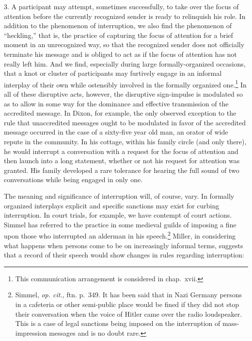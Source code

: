 \documentclass[twoside,symmetric,nobib,justified]{tufte-book}
\begin{document}
3. A participant may attempt, sometimes successfully, to take over the
focus of attention before the currently recognized sender is ready to
relinquish his role. In addition to the phenomenon of interruption, we
also find the phenomenon of ``heckling,'' that is, the practice of
capturing the focus of attention for a brief moment in an unrecognized
way, so that the recognized sender does not officially terminate his
message and is obliged to act as if the focus of attention has not
really left him. And we find, especially during large formally-organized
occasions, that a knot or cluster of participants may furtively engage
in an informal interplay of their own while ostensibly involved in the
formally organized one.\footnote{This communication arrangement is
  considered in chap.~xvii.} In all of these disruptive acts, however,
the disruptive sign-impulse is modulated so as to allow in some way for
the dominance and effective transmission of the accredited message. In
Dixon, for example, the only observed exception to the rule that
unaccredited messages ought to be modulated in favor of the accredited
message occurred in the case of a sixty-five year old man, an orator of
wide repute in the community. In his cottage, within his family circle
(and only there), he would interrupt a conversation with a request for
the focus of attention and then launch into a long statement, whether or
not his request for attention was granted. His family developed a rare
tolerance for hearing the full sound of two conversations while being
engaged in only one.

The meaning and significance of interruption will, of course, vary. In
formally organized interplays explicit and specific sanctions may exist
for curbing interruption. In court trials, for example, we have contempt
of court actions. Simmel has referred to the practice in some medieval
guilds of imposing a fine upon those who interrupted an alderman in his
speech.\footnote{Simmel, \emph{op. cit.}, ftn. p.~349. It has been said
  that in Nazi Germany persons in a cafeteria or other semi-public place
  would be fined if they did not stop their conversation when the voice
  of Hitler came over the radio loudspeaker. This is a case of legal
  sanctions being imposed on the interruption of mass-impression
  messages and is no doubt rare.} Miller, in considering what happens
when persons come to be on increasingly informal terms, suggests that a
record of their speech would show changes in rules regarding
interruption:

\vspace{0.125in}
\end{document}
